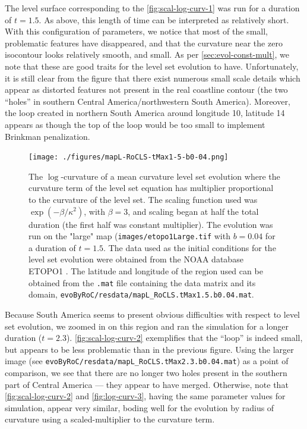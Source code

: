 \documentclass{article}
\begin{document}
The level surface corresponding to the
\autoref{fig:scal-log-curv-1} was run for a duration of
$t=1.5$. As above, this length of time can be interpreted as
relatively short. With this configuration of parameters, we notice
that most of the small, problematic features have disappeared, and
that the curvature near the zero isocontour looks relatively
smooth, and small. As per \autoref{sec:evol-const-mult}, we note
that these are good traits for the level set evolution to
have. Unfortunately, it is still clear from the figure that there
exist numerous small scale details which appear as distorted
features not present in the real coastline contour (\eg the two
``holes'' in southern Central America/northwestern South
America). Moreover, the loop created in northern South America
around longitude 10, latitude 14 appears as though the top of the
loop would be too small to implement Brinkman penalization. 

\begin{figure}[h]
  \centering \texttt{[image: ./figures/mapL-RoCLS-tMax1-5-b0-04.png]}
  \caption{The $\log$-curvature of a mean curvature level set
    evolution where the curvature term of the level set equation
    has multiplier proportional to the curvature of the level
    set. The scaling function used was $\exp (-\beta/\kappa^2)$,
    with $\beta = 3$, and scaling began at half the total duration
    (the first half was constant multiplier). The evolution was
    run on the "large" map (\texttt{images/etopo1Large.tif} with
    $b = 0.04$ for a duration of $t = 1.5$. The data used as the
    initial conditions for the level set evolution were obtained
    from the NOAA database ETOPO1 \cite{etopo1}. The latitude and
    longitude of the region used can be obtained from the
    \texttt{.mat} file containing the data matrix and its domain,
    \texttt{evoByRoC/resdata/mapL\_RoCLS.tMax1.5.b0.04.mat}. }
\label{fig:scal-log-curv-1}
\end{figure}

Because South America seems to present obvious difficulties with
respect to level set evolution, we zoomed in on this region and
ran the simulation for a longer duration ($t=
2.3$). \autoref{fig:scal-log-curv-2} exemplifies that the ``loop''
is indeed small, but appears to be less problematic than in the
previous figure. Using the larger image (see
\texttt{evoByRoC/resdata/mapL\_RoCLS.tMax2.3.b0.04.mat}) as a
point of comparison, we see that there are no longer two holes
present in the southern part of Central America --- they appear to
have merged. Otherwise, note that \autoref{fig:scal-log-curv-2}
and \autoref{fig:log-curv-3}, having the same parameter values for
simulation, appear very similar, boding well for the evolution by
radius of curvature using a scaled-multiplier to the curvature
term.
\end{document}
